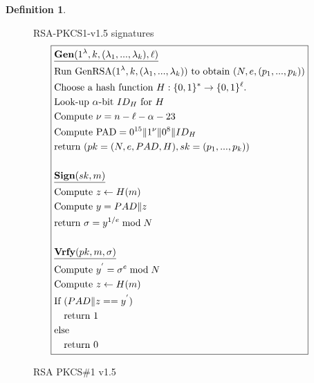 \documentclass[]{final_report}
\theoremstyle{definition}
\newtheorem{definition}{Definition}[chapter]
\begin{document}
\begin{definition}
\begin{figure}[H]
\centering
\hfill RSA-PKCS1-v1.5 signatures\hfill\phantom{} 
\[
\boxed{
\begin{aligned}
&\underline{\textbf{\text{Gen}} (1^\lambda, k, (\lambda_{1},...,\lambda_{k}), \ell)} \\
&\text{Run GenRSA}(1^\lambda, k, (\lambda_{1},...,\lambda_{k})) \text{ to obtain } (N, e, (p_{1},...,p_{k})) \\
&\text{Choose a hash function } H : \{0, 1\}^* \rightarrow \{0, 1\}^\ell. \\
&\text{Look-up } \alpha\text{-bit } ID_{H} \text{ for } H \\
&\text{Compute } \nu = n - \ell - \alpha - 23 \\
&\text{Compute PAD} = 0^{15} \| 1^{\nu} \| 0^8 \| ID_{H} \\
&\text{return } (pk = (N, e, PAD, H), sk =  (p_{1},...,p_{k})) \\
\\
&\underline{\textbf{\text{Sign}} (sk, m)} \\
&\text{Compute } z \leftarrow H(m) \\
&\text{Compute } y = PAD  \| z \\
&\text{return } \sigma = y^{1/e} \bmod N \\
\\
&\underline{\textbf{\text{Vrfy}} (pk, m, \sigma)} \\
&\text{Compute } y^{'} = \sigma^{e} \bmod N \\
&\text{Compute } z \leftarrow H(m) \\
&\text{If } (PAD \| z == y^{'}) \\
&\quad \text{return } 1 \\
&\text{else} \\
&\quad \text{return } 0 
\end{aligned}
}
\]
\caption{RSA PKCS\#1 v1.5}
\label{fig:pkcs}
\end{figure}
\end{definition}
\end{document}
